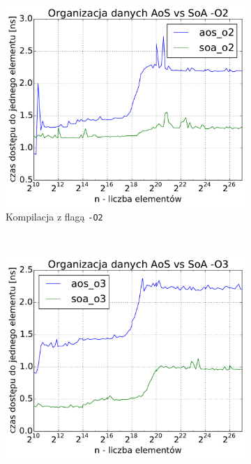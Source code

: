 \begin{figure}
\begin{subfigure}[c]{0.45\textwidth}
    \end{subfigure}
    \\
    \vspace{0.55cm}
    \begin{subfigure}[c]{0.45\textwidth}
        \centering
        \includegraphics[width=\textwidth]{images/benchs_xeon/aos_vs_soa_O2}
        \caption{Kompilacja z flagą \texttt{-O2}}
    \end{subfigure}
    ~
    \begin{subfigure}[c]{0.45\textwidth}
        \centering
        \includegraphics[width=\textwidth]{images/benchs_xeon/aos_vs_soa_O3}

\end{subfigure}
\end{figure}

